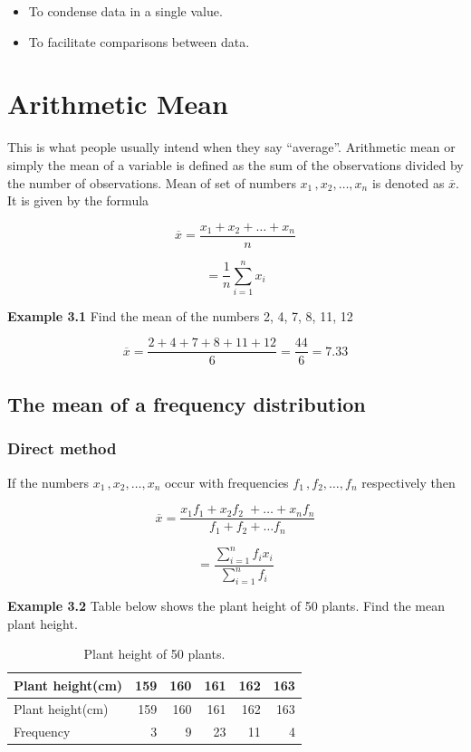 \documentclass[
]{book}
\begin{document}
\begin{itemize}
\item
  To condense data in a single value.
\item
  To facilitate comparisons between data.
\end{itemize}

\hypertarget{arithmetic-mean}{%
\section{Arithmetic Mean}\label{arithmetic-mean}}

This is what people usually intend when they say ``average''. Arithmetic
mean or simply the mean of a variable is defined as the sum of the
observations divided by the number of observations. Mean of set of
numbers \(x_{1\ },x_{2},\ldots,x_{n}\) is denoted as \(\overline{x}\). It is
given by the formula

\[\overline{x} = \frac{x_{1} + x_{2} + \ldots + x_{n}}{n}\]

\[= \frac{1}{n}\sum_{i = 1}^{n}x_{i}\]

\textbf{Example 3.1} Find the mean of the numbers 2, 4, 7, 8, 11, 12

\[\overline{x} = \frac{2 + 4 + 7 + 8 + 11 + 12}{6} = \frac{44}{6} = 7.33\]

\hypertarget{the-mean-of-a-frequency-distribution}{%
\subsection{The mean of a frequency distribution}\label{the-mean-of-a-frequency-distribution}}

\hypertarget{direct-method}{%
\subsubsection{Direct method}\label{direct-method}}

If the numbers \(x_{1\ },x_{2},\ldots,x_{n}\) occur with frequencies
\(f_{1\ },f_{2},\ldots,f_{n}\) respectively then

\[\overline{x} = \frac{x_{1}f_{1} + x_{2}f_{2\ \ } + \ldots + x_{n}f_{n}}{f_{1} + f_{2} + \ldots f_{n}}\]

\[= \frac{\sum_{i = 1}^{n}{f_{i}x_{i}}}{\sum_{i = 1}^{n}f_{i}}\]

\textbf{Example 3.2} Table below shows the plant height of 50 plants. Find
the mean plant height.

\begin{longtable}[]{@{}lrrrrr@{}}
\caption{\label{tab:plantheight} Plant height of 50 plants.}\tabularnewline
\toprule\noalign{}
Plant height(cm) & 159 & 160 & 161 & 162 & 163 \\
\midrule\noalign{}
\endfirsthead
\toprule\noalign{}
Plant height(cm) & 159 & 160 & 161 & 162 & 163 \\
\midrule\noalign{}
\endhead
\bottomrule\noalign{}
\endlastfoot
Frequency & 3 & 9 & 23 & 11 & 4 \\
\end{longtable}
\end{document}
